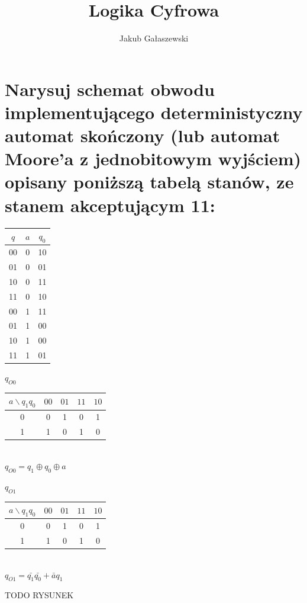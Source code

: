 \documentclass{article}
\title{Logika Cyfrowa}
\author{Jakub Gałaszewski}
\begin{document}
\maketitle
\section{Narysuj schemat obwodu implementującego deterministyczny automat skończony (lub automat Moore’a z jednobitowym wyjściem) opisany poniższą tabelą stanów, ze stanem akceptującym 11:}
\begin{center}
	\begin{tabular}{|c|c||c|} 
	 \hline
	$q$ & $a$ & $q_0$ \\ 
	 \hline \hline
	 00&0& 10\\ \hline
	 01&0& 01\\ \hline
	 10&0& 11\\ \hline
	 11&0& 10\\ \hline
	 00&1& 11\\ \hline
	 01&1& 00\\ \hline
	 10&1& 00\\ \hline
	 11&1& 01\\ \hline
	\end{tabular}
\end{center}

\begin{center}
	$q_{O0}$\\
	\begin{tabular}{|c|c|c|c|c|} 
	 \hline
	$a\backslash q_1q_0$ &$00$ & $01$ & $11$ & $10$ \\ 
	 \hline \hline
	 0&0&1&0&1\\ \hline
	 1&1&0&1&0\\ \hline
	\end{tabular}\\
	$q_{O0}=q_1 \oplus q_0 \oplus a$\\
\end{center}
\begin{center}
	$q_{O1}$\\
	\begin{tabular}{|c|c|c|c|c|} 
	 \hline
	$a\backslash q_1q_0$ &$00$ & $01$ & $11$ & $10$ \\ 
	 \hline \hline
	 0&0&1&0&1\\ \hline
	 1&1&0&1&0\\ \hline
	\end{tabular}\\
	$q_{O1}=\bar{q_1}\bar{q_0} + \bar{a}q_1$\\
\end{center}
TODO RYSUNEK
\end{document}
